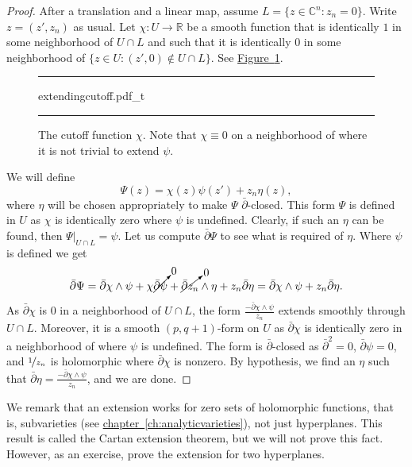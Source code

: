 \documentclass[12pt,openany]{book}
\newcommand{\C}{{\mathbb{C}}}
\newcommand{\R}{{\mathbb{R}}}
\theoremstyle{plain}
\theoremstyle{remark}
\theoremstyle{definition}
\newenvironment{myfig}{%
\begin{figure}[h!t]
\noindent\rule{\textwidth}{0.5pt}\vspace{12pt}\par\centering}%
{\par\noindent\rule{\textwidth}{0.5pt}
\end{figure}}
\theoremstyle{exercise}
\theoremstyle{example}
\newcommand{\figureref}[1]{\hyperref[#1]{Figure~\ref*{#1}}}
\newcommand{\chapterref}[1]{\hyperref[#1]{chapter~\ref*{#1}}}
\begin{document}
\begin{proof}
After a translation and a linear map, assume
$L = \{ z \in \C^n : z_n = 0 \}$.  Write $z = (z',z_n)$ as usual.
Let $\chi \colon U \to \R$ be a smooth function that is identically $1$ in some
neighborhood of $U \cap L$ and such that it is identically $0$ in some
neighborhood of $\{ z \in U : (z',0) \notin U \cap L \}$.
See \figureref{fig:extendingcutoff}.

\begin{myfig}
{extendingcutoff.pdf_t}
\caption{The cutoff function $\chi$.
Note that $\chi \equiv 0$ on a neighborhood of where it is not trivial
to extend $\psi$.\label{fig:extendingcutoff}}
\end{myfig}

We will define
\begin{equation*}
\Psi(z) = \chi(z) \psi(z') + z_n \eta(z) ,
\end{equation*}
where $\eta$ will be chosen appropriately to make $\Psi$
$\bar{\partial}$-closed.  This form $\Psi$ is defined in
$U$ as $\chi$ is identically zero where $\psi$ is undefined.
Clearly, if such an $\eta$ can be found,
then $\Psi|_{U \cap L} = \psi$.
Let us compute
$\bar{\partial} \Psi$
to see what is required of $\eta$.  Where $\psi$
is defined we get
\begin{equation*}
\bar{\partial} \Psi =
\bar{\partial}\chi \wedge \psi
+ \chi \cancelto{0}{\bar{\partial} \psi}
 + \cancelto{0}{\bar{\partial} z_n} \wedge \eta
 + z_n \bar{\partial} \eta
=
\bar{\partial}\chi \wedge \psi
 + z_n \bar{\partial} \eta .
\end{equation*}
As $\bar{\partial} \chi$ is $0$ in a neighborhood of $U \cap L$,
the form $\frac{- \bar{\partial}\chi \wedge \psi}{z_n}$ extends smoothly
through $U \cap L$.
Moreover, it is a
smooth $(p,q+1)$-form on $U$ as
$\bar{\partial}\chi$ is identically zero in a neighborhood of
where $\psi$ is undefined.
The form is
$\bar{\partial}$-closed as $\bar{\partial}^2 = 0$, $\bar{\partial}\psi = 0$,
and $\nicefrac{1}{z_n}$ is holomorphic where $\bar{\partial} \chi$ is
nonzero.
By hypothesis, we find an $\eta$ such that
$\bar{\partial} \eta = \frac{- \bar{\partial}\chi \wedge \psi}{z_n}$,
and we are done.
\end{proof}

We remark that an extension works for zero sets of holomorphic functions, that
is, subvarieties
(see \chapterref{ch:analyticvarieties}), not just
hyperplanes.   This result is called the Cartan extension theorem, but we will
not prove this fact.  However, as an exercise, prove the extension for
two hyperplanes.
\end{document}
